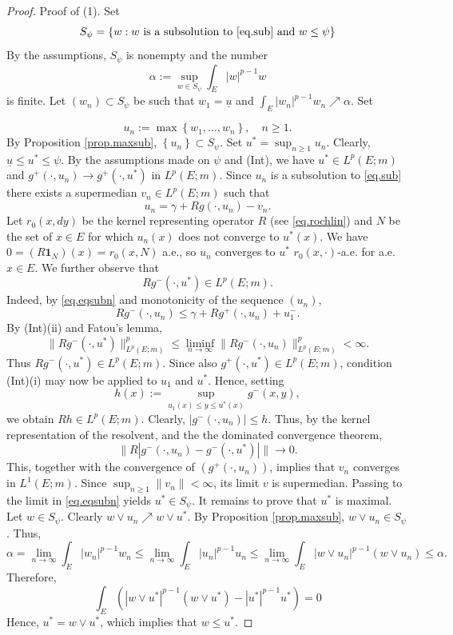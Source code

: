 \documentclass[11pt,a4paper,reqno]{amsart}
\theoremstyle{definition}
\numberwithin{equation}{section}
\begin{document}
\begin{proof}
Proof of  (1). Set
$$
S_\psi=\{w: w \text { is a subsolution to  \eqref{eq.sub}  and } w \leq \psi\}
$$
By the assumptions, $S_\psi$ is nonempty and the number
$$
\alpha:=\sup _{w\in S_{\psi}} \int_E |w|^{p-1}w
$$
is finite. 
Let $(w_n) \subset S_\psi$ be such that $w_1=\underline{u}$ and  $ \int_E |w_n|^{p-1}w_n  \nearrow \alpha$. Set

$$
u_n:=\max \left\{w_1, \ldots, w_n\right\}, \quad n \geq 1 .
$$
By Proposition \ref{prop.maxsub}, $\left\{u_n\right\} \subset S_\psi$. Set $u^*=\sup _{n \geq 1} u_n$. 
Clearly, $\underline{u} \leq u^* \leq \psi$.  By the assumptions made on $\psi$ and (Int), 
we have $u^*\in L^p(E;m)$ and  $g^+\left(\cdot, u_n\right)\to g^+\left(\cdot, u^*\right)$  in $ L^p(E;m)$. 
Since $u_n$ is a subsolution to \eqref{eq.sub} there exists a supermedian $v_n \in L^p(E;m)$ such that
\begin{equation}
\label{eq.eqsubn}
u_n=\gamma+R g\left(\cdot, u_n\right)-v_n.
\end{equation}
Let $r_0(x,dy)$ be the kernel  representing operator $R$ (see \eqref{eq.rochlin})
and $N$ be the set of $x\in E$ for which $u_n(x)$ does not converge to $u^*(x)$.
We have $0=(R\mathbf1_N)(x)=r_0(x,N)$ a.e.,  so  $u_n$
converges to $u^*$ $r_0(x,\cdot)$-a.e. for a.e. $x\in E$. 
We further  observe that
\[
R g^-(\cdot,u^*)\in L^p(E;m).
\]
Indeed, by \eqref{eq.eqsubn} and monotonicity of the sequence $(u_n)$,  
\[
R g^-(\cdot,u_n)
\le
\gamma+R g^+(\cdot,u_n)+u_1^-.
\]
By \textup{(Int)(ii)} and Fatou's lemma,
\[
\|R g^-(\cdot,u^*)\|_{L^p(E;m)}^p
\le
\liminf_{n\to\infty}
\|R g^-(\cdot,u_n)\|_{L^p(E;m)}^p
<\infty.
\]
Thus $R g^-(\cdot,u^*)\in L^p(E;m)$.
Since also $g^+(\cdot,u^*)\in L^p(E;m)$, condition
\textup{(Int)(i)} may now be applied to $u_1$ and $u^*$.
Hence, setting
\[
h(x):=\sup_{u_1(x)\le y\le u^*(x)}g^-(x,y),
\]
we obtain $Rh\in L^p(E;m)$. Clearly, $|g^-(\cdot,u_n)|\le h$. Thus, by the kernel representation of the resolvent,
and the the dominated convergence theorem,
\[
\|R|g^-(\cdot,u_n)-g^-(\cdot,u^*)|\|\to 0.
\]
This, together with the convergence of $(g^+(\cdot,u_n))$, implies that $v_n$ converges in $L^1(E;m)$.
Since $\sup_{n\ge 1}\|v_n\|<\infty$,  its limit $v$ is supermedian.
Passing to the limit in \eqref{eq.eqsubn} yields
$u^* \in S_\psi$. It remains to prove that  $u^*$ is maximal. 
Let $w \in S_\psi$. Clearly $w \vee u_n \nearrow w \vee u^*$. 
By Proposition \ref{prop.maxsub}, $w \vee u_n \in S_\psi$. Thus,
\[
\alpha=\lim _{n \rightarrow \infty} \int_E |w_n|^{p-1}w_n  \leq \lim _{n \rightarrow \infty} \int_E |u_n|^{p-1}u_n  
\leq \lim _{n \rightarrow \infty}\int_E |w \vee u_n|^{p-1}(w \vee u_n)  \leq \alpha.
\]
Therefore,
\[
\int_E \left(|w \vee u^*|^{p-1}(w \vee u^*)-|u^*|^{p-1}u^* \right)=0
\]
Hence, $u^* = w \vee u^*$, which implies that $w \leq u^*$.


\end{proof}
\end{document}
